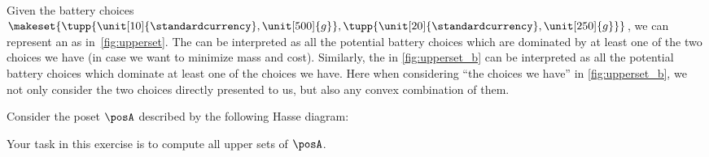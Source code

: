 \begin{marginfigure}
    \\
    \caption{}
\end{marginfigure}
%

Given the battery choices~$\makeset{\tupp{\unit[10]{\standardcurrency},\unit[500]{g}}, \tupp{\unit[20]{\standardcurrency},\unit[250]{g}}}$, we can represent an  as in~\cref{fig:upperset}.
The  can be interpreted as all the potential battery choices which are dominated by at least one of the two choices we have (in case we want to minimize mass and cost).
Similarly, the  in \cref{fig:upperset_b} can be interpreted as all the potential battery choices which dominate at least one of the choices we have.
Here when considering ``the choices we have'' in \cref{fig:upperset_b}, we not only consider the two choices directly presented to us, but also any convex combination of them.


\begin{gradedexercise}
    \label{ex:UpperSetsOfPreferences}

    Consider the poset $\posA$ described by the following Hasse diagram:
    \begin{center}
    \end{center}
    Your task in this exercise is to compute all upper sets of $\posA$.
\end{gradedexercise}

